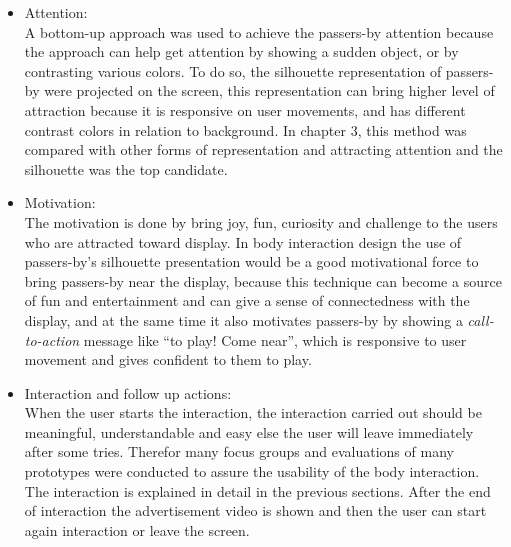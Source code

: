 \begin{itemize}

\item Attention: \\
A bottom-up approach was used to achieve the passers-by attention because the approach can help get attention by showing a sudden object, or by contrasting various colors. To do so, the silhouette representation of passers-by were projected on the screen, this representation can bring higher level of attraction because it is responsive on user movements, and has different contrast colors in relation to background. In chapter 3, this method was compared with other forms of representation and attracting attention and the silhouette was the top candidate.

\item Motivation: \\
The motivation is done by bring joy, fun, curiosity and challenge\cite{ toward_motivation} to the users who are attracted toward display. In body interaction design the use of passers-by’s silhouette presentation would be a good motivational force to bring passers-by near the display, because this technique can become a source of fun and entertainment and can give a sense of connectedness with the display, and at the same time it also motivates passers-by by showing a \emph{call-to-action} message like “to play! Come near”, which is responsive to user movement and gives confident to them to play.

\item Interaction and follow up actions: \\
When the user starts the interaction, the interaction carried out should be meaningful, understandable and easy else the user will leave immediately after some tries. Therefor many focus groups and evaluations of many prototypes were conducted to assure the usability of the body interaction. The interaction is explained in detail in the previous sections.
After the end of interaction the advertisement video is shown and then the user can start again interaction or leave the screen.
\end{itemize}



